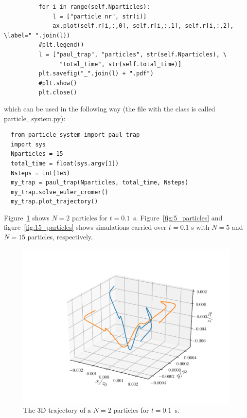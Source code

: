 \documentclass[%
oneside,                 %
final,                   %
10pt]{article}
\newenvironment{doconceexercise}{}{}
\begin{document}
\begin{doconceexercise}
\begin{verbatim}
          for i in range(self.Nparticles):
              l = ["particle nr", str(i)]
              ax.plot(self.r[i,:,0], self.r[i,:,1], self.r[i,:,2], \label=" ".join(l))
          #plt.legend()
          l = ["paul_trap", "particles", str(self.Nparticles), \
                "total_time", str(self.total_time)]
          plt.savefig("_".join(l) + ".pdf")
          #plt.show()
          plt.close()
\end{verbatim}
which can be used in the following way (the file with the class is called particle\_system.py):
\begin{verbatim}
  from particle_system import paul_trap
  import sys
  Nparticles = 15
  total_time = float(sys.argv[1])
  Nsteps = int(1e5)
  my_trap = paul_trap(Nparticles, total_time, Nsteps)
  my_trap.solve_euler_cromer()
  my_trap.plot_trajectory()
\end{verbatim}
Figure~\ref{fig:2_particles} shows $N = 2$ particles for $t=0.1$ s. Figure~\ref{fig:5_particles} and figure~\ref{fig:15_particles} shows simulations carried over $t = 0.1$ s with $N = 5$ and $N = 15$ particles, respectively.


\begin{figure}[!ht]  %
  \centerline{\includegraphics[width=0.8\linewidth]{figures/paul_trap_particles_2_total_time_0.1.pdf}}
  \caption{
  The 3D trajectory of a $N = 2$ particles for $t = 0.1$ s. \label{fig:2_particles}
  }
\end{figure}




\end{doconceexercise}
\end{document}
